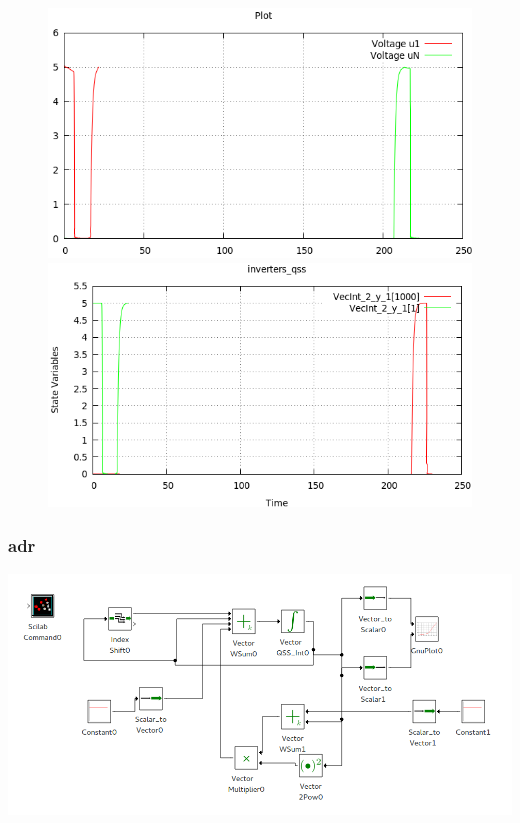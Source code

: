 \documentclass[a4paper,	11pt]{report}
\begin{document}
\begin{figure}[H]
\centering
\begin{minipage}{0.5\textwidth}
\centering
 \includegraphics[width=\linewidth]{inversers-pd}
\end{minipage}\hfill
\begin{minipage}{0.5\textwidth}
\centering
 \includegraphics[width=\linewidth]{inversers-qss}
\end{minipage}
\end{figure}

\subsubsection{adr}


 \includegraphics[width=0.75\linewidth]{adr-pwd}
\end{document}

